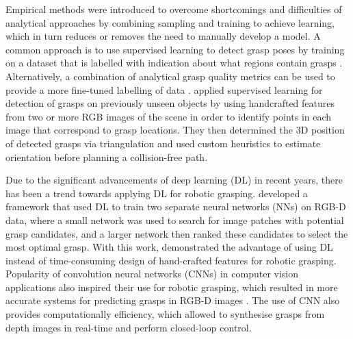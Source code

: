 Empirical methods were introduced to overcome shortcomings and difficulties of analytical approaches by combining sampling and training to achieve learning, which in turn reduces or removes the need to manually develop a model. A common approach is to use supervised learning to detect grasp poses by training on a dataset that is labelled with indication about what regions contain grasps \cite{saxena_robotic_2008, lenz_deep_2015}. Alternatively, a combination of analytical grasp quality metrics can be used to provide a more fine-tuned labelling of data \cite{mahler_dex-net_2017, mahler_dex-net_2018, mahler_learning_2019, lundell_robust_2019}. \citet{saxena_robotic_2008} applied supervised learning for detection of grasps on previously unseen objects by using handcrafted features from two or more RGB images of the scene in order to identify points in each image that correspond to grasp locations. They then determined the 3D position of detected grasps via triangulation and used custom heuristics to estimate orientation before planning a collision-free path.

Due to the significant advancements of deep learning (DL) in recent years, there has been a trend towards applying DL for robotic grasping. \citet{lenz_deep_2015} developed a framework that used DL to train two separate neural networks (NNs) on RGB-D data, where a small network was used to search for image patches with potential grasp candidates, and a larger network then ranked these candidates to select the most optimal grasp. With this work, \citeauthor{lenz_deep_2015} demonstrated the advantage of using DL instead of time-consuming design of hand-crafted features for robotic grasping. Popularity of convolution neural networks (CNNs) in computer vision applications also inspired their use for robotic grasping, which resulted in more accurate systems for predicting grasps in RGB-D images \cite{redmon_real-time_2015, kumra_robotic_2017}. The use of CNN also provides computationally efficiency, which allowed \citet{morrison_closing_2018} to synthesise grasps from depth images in real-time and perform closed-loop control.

